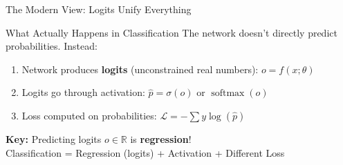 \documentclass[xcolor=svgnames, 8pt, handout, standalone]{beamer}
\newcommand{\1}{\mathbf{1}}
\newcommand{\softmax}{\operatorname{softmax}}
\begin{document}
\begin{frame}{The Modern View: Logits Unify Everything}
\begin{block}{What Actually Happens in Classification}
The network doesn't directly predict probabilities. Instead:
\begin{enumerate}
\item Network produces \textbf{logits} (unconstrained real numbers): $o = f(x; \theta)$
\item Logits go through activation: $\hat{p} = \sigma(o)$ or $\softmax(o)$
\item Loss computed on probabilities: $\mathcal{L} = -\sum y \log(\hat{p})$
\end{enumerate}
\end{block}

\pause
\begin{tcolorbox}[colback=lightblue, colframe=deepblue, boxrule=2pt]
\textbf{Key:} Predicting logits $o \in \mathbb{R}$ is \textbf{regression}!\\
Classification = Regression (logits) + Activation + Different Loss
\end{tcolorbox}
\end{frame}
\end{document}
